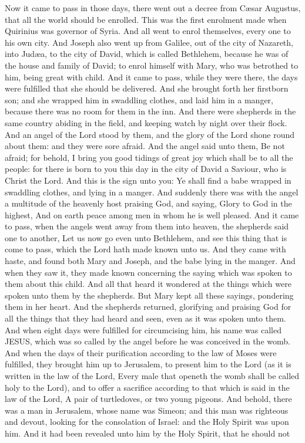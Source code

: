 Now it came to pass in those days, there went out a decree from Cæsar Augustus, that all the world should be enrolled. This was the first enrolment made when Quirinius was governor of Syria. And all went to enrol themselves, every one to his own city. And Joseph also went up from Galilee, out of the city of Nazareth, into Judæa, to the city of David, which is called Bethlehem, because he was of the house and family of David; to enrol himself with Mary, who was betrothed to him, being great with child. And it came to pass, while they were there, the days were fulfilled that she should be delivered. And she brought forth her firstborn son; and she wrapped him in swaddling clothes, and laid him in a manger, because there was no room for them in the inn.  And there were shepherds in the same country abiding in the field, and keeping watch by night over their flock. And an angel of the Lord stood by them, and the glory of the Lord shone round about them: and they were sore afraid. And the angel said unto them, Be not afraid; for behold, I bring you good tidings of great joy which shall be to all the people: for there is born to you this day in the city of David a Saviour, who is Christ the Lord. And this is the sign unto you: Ye shall find a babe wrapped in swaddling clothes, and lying in a manger. And suddenly there was with the angel a multitude of the heavenly host praising God, and saying,  Glory to God in the highest, And on earth peace among men in whom he is well pleased.  And it came to pass, when the angels went away from them into heaven, the shepherds said one to another, Let us now go even unto Bethlehem, and see this thing that is come to pass, which the Lord hath made known unto us. And they came with haste, and found both Mary and Joseph, and the babe lying in the manger. And when they saw it, they made known concerning the saying which was spoken to them about this child. And all that heard it wondered at the things which were spoken unto them by the shepherds. But Mary kept all these sayings, pondering them in her heart. And the shepherds returned, glorifying and praising God for all the things that they had heard and seen, even as it was spoken unto them.  And when eight days were fulfilled for circumcising him, his name was called JESUS, which was so called by the angel before he was conceived in the womb.  And when the days of their purification according to the law of Moses were fulfilled, they brought him up to Jerusalem, to present him to the Lord (as it is written in the law of the Lord, Every male that openeth the womb shall be called holy to the Lord), and to offer a sacrifice according to that which is said in the law of the Lord, A pair of turtledoves, or two young pigeons. And behold, there was a man in Jerusalem, whose name was Simeon; and this man was righteous and devout, looking for the consolation of Israel: and the Holy Spirit was upon him. And it had been revealed unto him by the Holy Spirit, that he should not 